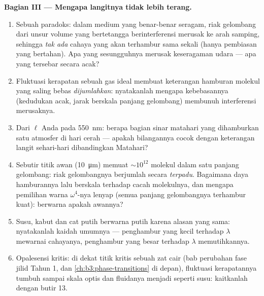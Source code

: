 \begin{problem}
\medskip\noindent\textbf{Bagian III --- Mengapa langitnya tidak lebih
terang.}
\begin{enumerate}[resume]
  \item Sebuah paradoks: dalam medium yang benar-benar seragam, riak
        gelombang dari unsur volume yang bertetangga berinterferensi
        merusak ke arah samping, sehingga \emph{tak ada} cahaya yang
        akan terhambur sama sekali (hanya pembiasan yang bertahan). Apa
        yang sesungguhnya merusak keseragaman udara --- apa yang
        tersebar secara acak?
  \item Fluktuasi kerapatan sebuah gas ideal membuat keterangan
        hamburan molekul yang saling bebas \emph{dijumlahkan}:
        nyatakanlah mengapa kebebasannya (kedudukan acak, jarak
        berskala panjang gelombang) membunuh interferensi merusaknya.
  \item Dari $\ell$ Anda pada \qty{550}{nm}: berapa bagian sinar
        matahari yang dihamburkan satu atmosfer di hari cerah ---
        apakah bilangannya cocok dengan keterangan langit sehari-hari
        dibandingkan Matahari?
  \item Sebutir titik awan (\qty{10}{\micro m}) memuat
        $\sim10^{12}$ molekul dalam satu panjang gelombang: riak
        gelombangnya berjumlah secara \emph{terpadu}. Bagaimana daya
        hamburannya lalu berskala terhadap cacah molekulnya, dan
        mengapa pemilihan warna $\omega^4$-nya lenyap (semua panjang
        gelombangnya terhambur kuat): berwarna apakah awannya?
  \item Susu, kabut dan cat putih berwarna putih karena alasan yang
        sama: nyatakanlah kaidah umumnya --- penghambur yang kecil
        terhadap $\lambda$ mewarnai cahayanya, penghambur yang besar
        terhadap $\lambda$ memutihkannya.
  \item Opalesensi kritis: di dekat titik kritis sebuah zat cair
        (bab perubahan fase jilid Tahun 1, dan
        \cref{ch:b3:phase-transitions} di depan), fluktuasi kerapatannya tumbuh sampai skala optis dan
        fluidanya menjadi seperti susu: kaitkanlah dengan butir 13.
\end{enumerate}


\end{problem}
